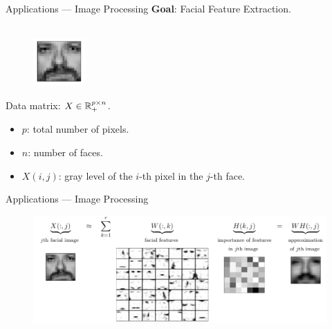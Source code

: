\begin{frame}{Applications --- Image Processing}
    \textbf{Goal}: Facial Feature Extraction.\\
    ~\\
    \begin{figure}
        \centering
        \includegraphics[width=2cm]{../images/face_image.png}
    \end{figure}
    Data matrix: $X\in\mathbb{R}^{p\times n}_+$.\\
    \begin{itemize}
        \item $p$: total number of pixels.
        \item $n$: number of faces.
        \item $X(i,j)$: gray level of the $i$-th pixel in the $j$-th face.
    \end{itemize}
\end{frame}
    
\begin{frame}{Applications --- Image Processing}
    \begin{figure}
        \centering
        \includegraphics[width=\linewidth]{../images/NMF_app1.png}
    \end{figure}
\end{frame}

